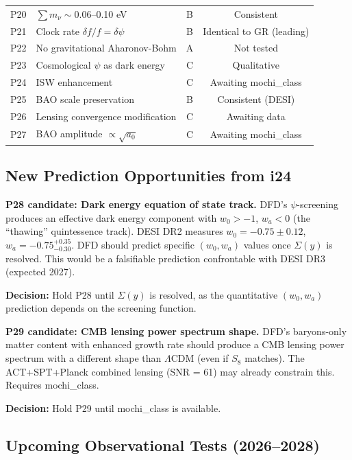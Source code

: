 \documentclass[11pt]{article}
\newcommand{\LCDM}{$\Lambda$CDM}
\newcommand{\aM}{a_0}
\begin{document}
\begin{longtable}{clcc}
P20 & $\sum m_\nu \sim 0.06$--0.10 eV & B & Consistent \\
P21 & Clock rate $\delta f/f = \delta\psi$ & B & Identical to GR (leading) \\
P22 & No gravitational Aharonov-Bohm & A & Not tested \\
P23 & Cosmological $\psi$ as dark energy & C & Qualitative \\
P24 & ISW enhancement & C & Awaiting mochi\_class \\
P25 & BAO scale preservation & B & Consistent (DESI) \\
P26 & Lensing convergence modification & C & Awaiting data \\
P27 & BAO amplitude $\propto \sqrt{\aM}$ & C & Awaiting mochi\_class \\
\bottomrule
\end{longtable}

\subsection{New Prediction Opportunities from i24}

\textbf{P28 candidate: Dark energy equation of state track.}
DFD's $\psi$-screening produces an effective dark energy component
with $w_0 > -1$, $w_a < 0$ (the ``thawing'' quintessence track).
DESI DR2 measures $w_0 = -0.75 \pm 0.12$, $w_a = -0.75^{+0.35}_{-0.30}$.
DFD should predict specific $(w_0, w_a)$ values once $\Sigma(y)$ is
resolved. This would be a falsifiable prediction confrontable with
DESI DR3 (expected 2027).

\textbf{Decision:} Hold P28 until $\Sigma(y)$ is resolved, as the
quantitative $(w_0, w_a)$ prediction depends on the screening function.

\textbf{P29 candidate: CMB lensing power spectrum shape.}
DFD's baryons-only matter content with enhanced growth rate should
produce a CMB lensing power spectrum with a different shape than
\LCDM{} (even if $S_8$ matches). The ACT+SPT+Planck combined lensing
(SNR = 61) may already constrain this. Requires mochi\_class.

\textbf{Decision:} Hold P29 until mochi\_class is available.

\subsection{Upcoming Observational Tests (2026--2028)}
\end{document}
